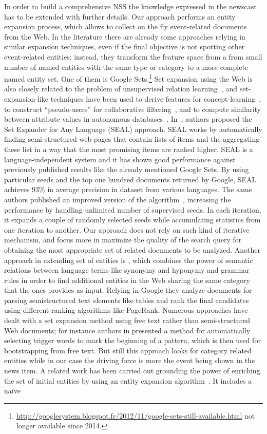 \documentclass{llncs}
\begin{document}
In order to build a comprehensive NSS the knowledge expressed in the newscast has to be extended with further details. Our approach performs an entity expansion process, which allows to collect on the fly event-related documents from the Web. 
In the literature there are already some approaches relying in similar expansion techniques, even if the final objective is not spotting other event-related entities: instead, they transform the feature space from a from small number of named entities with the same type or category to a more complete named entity set. One of them is Google Sets.\footnote{\url{http://googlesystem.blogspot.fr/2012/11/google-sets-still-available.html} not longer available since 2014.} Set expansion using the Web is also closely related to the problem of unsupervised relation learning~\cite{Cafarella2005}, and set-expansion-like techniques have been used to derive features for concept-learning~\cite{Cohen2000}, to construct ``pseudo-users'' for collaborative filtering~\cite{Cohen99}, and to compute similarity between attribute values in autonomous databases~\cite{Wolf2007}. In~\cite{Wang2007}, authors proposed the Set Expander for Any Language (SEAL) approach. SEAL works by automatically finding semi-structured web pages that contain lists of items and the aggregating these list in a way that the most promising items are ranked higher. SEAL is a language-independent system and it has shown good performance against previously published results like the already mentioned Google Sets. By using particular seeds and the top one hundred documents returned by Google, SEAL achieves 93\% in average precision in dataset from various languages. The same authors published an improved version of the algorithm~\cite{Wang2008}, increasing the performance by handling unlimited number of supervised seeds. In each iteration, it expands a couple of randomly selected seeds while accumulating statistics from one iteration to another. Our approach does not rely on such kind of iterative mechanism, and focus more in maximize the quality of the search query for obtaining the most appropriate set of related documents to be analyzed. Another approach in extending set of entities is \cite{Mai-Vu2010}, which combines the power of semantic relations between language terms like synonymy and hyponymy and grammar rules in order to find additional entities in the Web sharing the same category that the ones provides as input. Relying in Google they analyze documents for parsing semistructured text elements like tables and rank the final candidates using different ranking algorithms like PageRank. Numerous approaches have dealt with a set expansion method using free text rather than semi-structured Web documents; for instance authors in \cite{Talukdar2006} presented a method for automatically selecting trigger words to mark the beginning of a pattern, which is then used for bootstrapping from free text. But still this approach looks for category related entities while in our case the driving force is more the event being shown in the news item. A related work has been carried out grounding the power of enriching the set of initial entities by using an entity expansion algorithm~\cite{RedondoGarcia2014}. It includes a naive 
\end{document}
